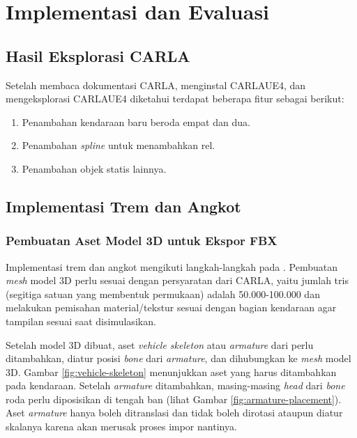 \chapter{Implementasi dan Evaluasi}

\section{Hasil Eksplorasi CARLA}

Setelah membaca dokumentasi CARLA, menginstal CARLAUE4, dan mengeksplorasi
CARLAUE4 diketahui terdapat beberapa fitur sebagai berikut:

\begin{enumerate}
	\item Penambahan kendaraan baru beroda empat dan dua.
	\item Penambahan \textit{spline} untuk menambahkan rel.
	\item Penambahan objek statis lainnya.
\end{enumerate}



\section{Implementasi Trem dan Angkot}

\subsection{Pembuatan Aset Model 3D untuk Ekspor FBX}

Implementasi trem dan angkot mengikuti langkah-langkah pada
\textcite{blender-add-a-new-vehicle}. Pembuatan \textit{mesh} model 3D perlu
sesuai dengan persyaratan dari CARLA, yaitu jumlah tris (segitiga satuan yang
membentuk permukaan) adalah 50.000-100.000 dan melakukan pemisahan
material/tekstur sesuai dengan bagian kendaraan agar tampilan sesuai saat
disimulasikan.

Setelah model 3D dibuat, aset \textit{vehicle skeleton} atau \textit{armature}
dari \cite{blender-add-a-new-vehicle} perlu ditambahkan, diatur posisi
\textit{bone} dari \textit{armature}, dan dihubungkan ke \textit{mesh} model 3D.
Gambar \ref{fig:vehicle-skeleton} menunjukkan aset yang harus ditambahkan pada
kendaraan. Setelah \textit{armature} ditambahkan, masing-masing \textit{head}
dari \textit{bone} roda perlu diposisikan di tengah ban (lihat Gambar
\ref{fig:armature-placement}). Aset \textit{armature} hanya boleh ditranslasi
dan tidak boleh dirotasi ataupun diatur skalanya karena akan merusak proses
impor nantinya.

